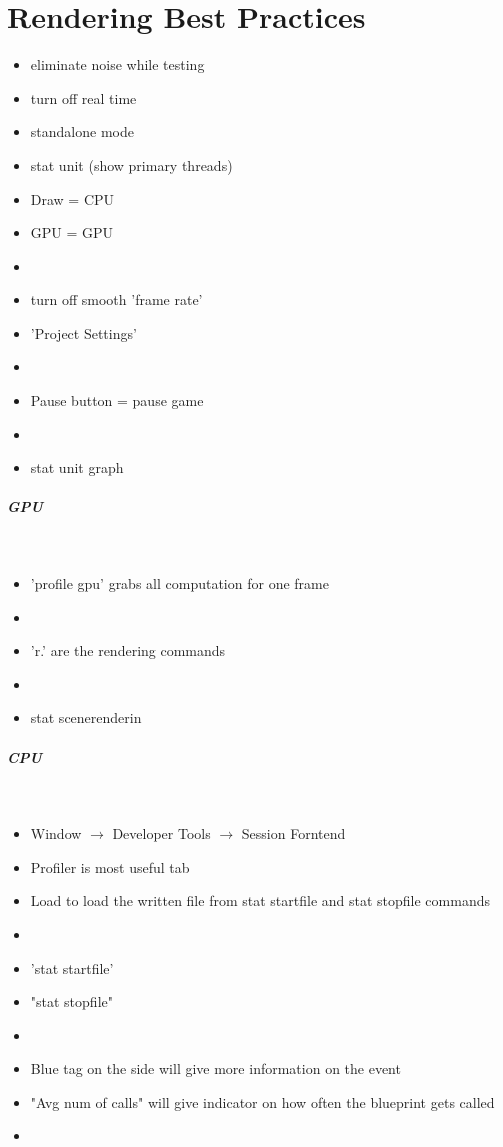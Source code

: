 \chapter{Rendering Best Practices}
    \begin{itemize}
        \item eliminate noise while testing
        \item turn off real time
        \item standalone mode
        \item stat unit (show primary threads)
        \item Draw = CPU
        \item GPU = GPU
        \item 
        \item turn off smooth 'frame rate'
        \item 'Project Settings'
        \item 
        \item Pause button = pause game
        \item 
        \item stat unit graph
    \end{itemize}


    \paragraph{GPU} \mbox{} \\
    \begin{itemize}
        \item 'profile gpu' grabs all computation for one frame
        \item 
        \item 'r.' are the rendering commands
        \item 
        \item stat scenerenderin
    \end{itemize}

    \paragraph{CPU} \mbox{} \\
    \begin{itemize}
        \item Window $\rightarrow$ Developer Tools $\rightarrow$ Session Forntend
        \item Profiler is most useful tab
        \item Load to load the written file from stat startfile and stat stopfile commands
        \item 
        \item 'stat startfile'
        \item "stat stopfile"
        \item 
        \item Blue tag on the side will give more information on the event
        \item "Avg num of calls" will give indicator on how often the blueprint gets called
        \item 
    \end{itemize}